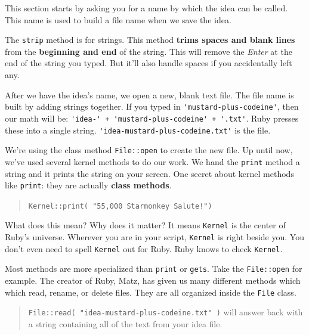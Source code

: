 \documentclass[10pt,twoside]{report}
\begin{document}
This section starts by asking you for a name by which the idea can be
called.  This name is used to build a file name when we save the idea.

The \lstinline[breaklines=true]|strip| method is for strings.  This
method {\bf trims spaces and blank lines} from the {\bf beginning and
  end} of the string.  This will remove the {\em Enter} at the end of
the string you typed. But it'll also handle spaces if you accidentally
left any.

After we have the idea's name, we open a new, blank text file.  The
file name is built by adding strings together.  If you typed in
\lstinline[breaklines=true]|'mustard-plus-codeine'|, then our math
will be: \lstinline[breaklines=true]|'idea-' + 'mustard-plus-codeine' + '.txt'|.  
Ruby presses these into a single string. 
\lstinline[breaklines=true]|'idea-mustard-plus-codeine.txt'|
is the file.

We're using the class method \lstinline[breaklines=true]|File::open|
to create the new file.  Up until now, we've used several kernel
methods to do our work.  We hand the
\lstinline[breaklines=true]|print| method a string and it prints the
string on your screen.  One secret about kernel methods like
\lstinline[breaklines=true]|print|: they are actually {\bf class
  methods}.

\begin{quote}
\lstinline[breaklines=true]|Kernel::print( "55,000 Starmonkey Salute!")|\end{quote}


What does this mean?  Why does it matter?  It means
\lstinline[breaklines=true]|Kernel| is the center of Ruby's
universe. Wherever you are in your script,
\lstinline[breaklines=true]|Kernel| is right beside you.  You don't
even need to spell \lstinline[breaklines=true]|Kernel| out for Ruby.
Ruby knows to check \lstinline[breaklines=true]|Kernel|.

Most methods are more specialized than
\lstinline[breaklines=true]|print| or
\lstinline[breaklines=true]|gets|.  Take the
\lstinline[breaklines=true]|File::open| for example.  The creator of
Ruby, Matz, has given us many different methods which which read,
rename, or delete files.  They are all organized inside the
\lstinline[breaklines=true]|File| class.

\begin{quote}
\lstinline[breaklines=true]|File::read( "idea-mustard-plus-codeine.txt" )|
will answer back with a string containing all of the text from your
idea file.\end{quote}
\end{document}
